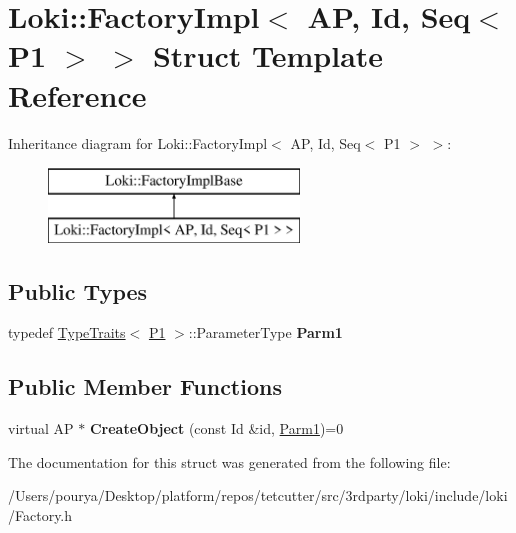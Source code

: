 \hypertarget{structLoki_1_1FactoryImpl_3_01AP_00_01Id_00_01Seq_3_01P1_01_4_01_4}{}\section{Loki\+:\+:Factory\+Impl$<$ A\+P, Id, Seq$<$ P1 $>$ $>$ Struct Template Reference}
\label{structLoki_1_1FactoryImpl_3_01AP_00_01Id_00_01Seq_3_01P1_01_4_01_4}
Inheritance diagram for Loki\+:\+:Factory\+Impl$<$ A\+P, Id, Seq$<$ P1 $>$ $>$\+:\begin{figure}[H]
\begin{center}
\leavevmode
\includegraphics[height=2.000000cm]{structLoki_1_1FactoryImpl_3_01AP_00_01Id_00_01Seq_3_01P1_01_4_01_4}
\end{center}
\end{figure}
\subsection*{Public Types}
\begin{DoxyCompactItemize}
\item 
\hypertarget{structLoki_1_1FactoryImpl_3_01AP_00_01Id_00_01Seq_3_01P1_01_4_01_4_ac62b9f40f52d3103b0e686f9ba9fe6a4}{}typedef \hyperlink{classLoki_1_1TypeTraits}{Type\+Traits}$<$ \hyperlink{structP1}{P1} $>$\+::Parameter\+Type {\bfseries Parm1}\label{structLoki_1_1FactoryImpl_3_01AP_00_01Id_00_01Seq_3_01P1_01_4_01_4_ac62b9f40f52d3103b0e686f9ba9fe6a4}

\end{DoxyCompactItemize}
\subsection*{Public Member Functions}
\begin{DoxyCompactItemize}
\item 
\hypertarget{structLoki_1_1FactoryImpl_3_01AP_00_01Id_00_01Seq_3_01P1_01_4_01_4_a162f470b46f7341e39214b6c8c005504}{}virtual A\+P $\ast$ {\bfseries Create\+Object} (const Id \&id, \hyperlink{classLoki_1_1EmptyType}{Parm1})=0\label{structLoki_1_1FactoryImpl_3_01AP_00_01Id_00_01Seq_3_01P1_01_4_01_4_a162f470b46f7341e39214b6c8c005504}

\end{DoxyCompactItemize}


The documentation for this struct was generated from the following file\+:\begin{DoxyCompactItemize}
\item 
/\+Users/pourya/\+Desktop/platform/repos/tetcutter/src/3rdparty/loki/include/loki/Factory.\+h\end{DoxyCompactItemize}
